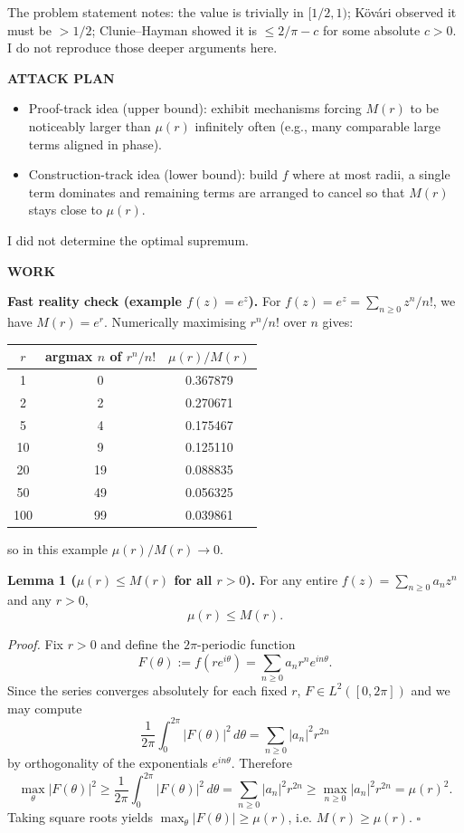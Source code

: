 The problem statement notes: the value is trivially in $[1/2,1)$; K\"ov\'ari observed it must be $>1/2$; Clunie--Hayman showed it is $\le 2/\pi-c$ for some absolute $c>0$. I do not reproduce those deeper arguments here.

\medskip
\noindent\textbf{ATTACK PLAN}

\begin{itemize}
\item Proof-track idea (upper bound): exhibit mechanisms forcing $M(r)$ to be noticeably larger than $\mu(r)$ infinitely often (e.g., many comparable large terms aligned in phase).
\item Construction-track idea (lower bound): build $f$ where at most radii, a single term dominates and remaining terms are arranged to cancel so that $M(r)$ stays close to $\mu(r)$.
\end{itemize}
I did not determine the optimal supremum.

\medskip
\noindent\textbf{WORK}

\noindent\textbf{Fast reality check (example $f(z)=e^z$).}
For $f(z)=e^z=\sum_{n\ge 0} z^n/n!$, we have $M(r)=e^r$. Numerically maximising $r^n/n!$ over $n$ gives:

\begin{center}
\begin{tabular}{c|c|c}
$r$ & argmax $n$ of $r^n/n!$ & $\mu(r)/M(r)$\\
\hline
1 & 0 & 0.367879\\
2 & 2 & 0.270671\\
5 & 4 & 0.175467\\
10 & 9 & 0.125110\\
20 & 19 & 0.088835\\
50 & 49 & 0.056325\\
100 & 99 & 0.039861\\
\end{tabular}
\end{center}
so in this example $\mu(r)/M(r)\to 0$.

\medskip
\noindent\textbf{Lemma 1 ($\mu(r)\le M(r)$ for all $r>0$).}
For any entire $f(z)=\sum_{n\ge 0} a_n z^n$ and any $r>0$,
\[
\mu(r)\le M(r).
\]

\textit{Proof.}
Fix $r>0$ and define the $2\pi$-periodic function
\[
F(\theta):=f(re^{i\theta})=\sum_{n\ge 0} a_n r^n e^{in\theta}.
\]
Since the series converges absolutely for each fixed $r$, $F\in L^2([0,2\pi])$ and we may compute
\[
\frac{1}{2\pi}\int_0^{2\pi} |F(\theta)|^2\,d\theta
=\sum_{n\ge 0} |a_n|^2 r^{2n}
\]
by orthogonality of the exponentials $e^{in\theta}$.
Therefore
\[
\max_{\theta} |F(\theta)|^2 \ge \frac{1}{2\pi}\int_0^{2\pi} |F(\theta)|^2\,d\theta
=\sum_{n\ge 0} |a_n|^2 r^{2n} \ge \max_{n\ge 0} |a_n|^2 r^{2n} = \mu(r)^2.
\]
Taking square roots yields $\max_{\theta}|F(\theta)|\ge \mu(r)$, i.e. $M(r)\ge \mu(r)$.
\hfill$\square$

